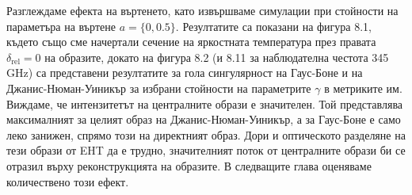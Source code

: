 Разглеждаме ефекта на въртенето, като извършваме симулации при стойности на параметъра на въртене $a = \{0, 0.5\}$. Резултатите са показани на фигура 8.1, където също сме начертали сечение на яркостната температура през правата $\delta_{\text{rel}} = 0$ на образите, докато на фигура 8.2 (и 8.11 за наблюдателна честота 345 GHz) са представени резултатите за гола сингулярност на Гаус-Боне и на Джанис-Нюман-Уиникър за избрани стойности на параметрите $\gamma$ в метриките им.\\

\noindent Виждаме, че интензитетът на централните образи е значителен. Той представлява максималният за целият образ на Джанис-Нюман-Уиникър, а за Гаус-Боне е само леко занижен, спрямо този на директният образ. Дори и оптическото разделяне на тези образи от EHT да е трудно, значителният поток от централните образи би се отразил върху реконструкцията на образите. В следващите глава оценяваме количествено този ефект.
\newpage

